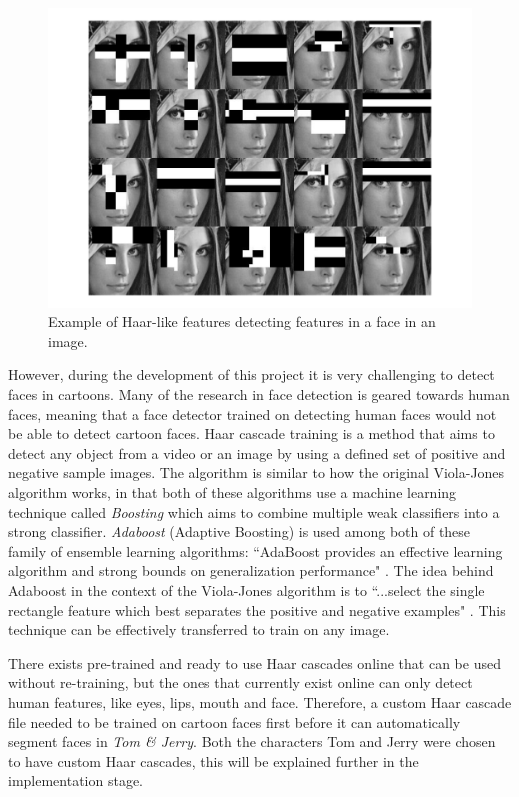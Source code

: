 \documentclass[report, 11pt, oneside]{dissertation}
\begin{document}
\begin{figure}[!htb]
	\centering
	\includegraphics[scale=0.50]{figure_23.pdf}
	\caption[Haar-like features detecting features in a face.]{Example of Haar-like features detecting features in a face in an image.}
	\label{fig:viola_jones}
\end{figure}

However, during the development of this project it is very challenging to detect faces in cartoons. Many of the research in face detection is geared towards human faces, meaning that a face detector trained on detecting human faces would not be able to detect cartoon faces. Haar cascade training is a method that aims to detect any object from a video or an image by using a defined set of positive and negative sample images. The algorithm is similar to how the original Viola-Jones algorithm works, in that both of these algorithms use a machine learning technique called \textit{Boosting} which aims to combine multiple weak classifiers into a strong classifier. \textit{Adaboost} (Adaptive Boosting) is used among both of these family of ensemble learning algorithms: ``AdaBoost provides an effective learning algorithm and strong bounds on generalization performance" \citep[2]{Viola:2001ks}. The idea behind Adaboost in the context of the Viola-Jones algorithm is to ``...select the single rectangle feature which best separates the positive and negative examples" \citep[3]{Viola:2001ks}. This technique can be effectively transferred to train on any image.

There exists pre-trained and ready to use Haar cascades online that can be used without re-training, but the ones that currently exist online can only detect human features, like eyes, lips, mouth and face. Therefore, a custom Haar cascade file needed to be trained on cartoon faces first before it can automatically segment faces in \textit{Tom \& Jerry}. Both the characters Tom and Jerry were chosen to have custom Haar cascades, this will be explained further in the implementation stage.
\end{document}
